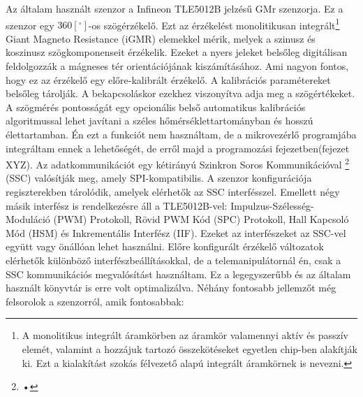 
Az általam használt szenzor a Infineon TLE5012B jelzésű GMr szenzorja. Ez a szenzor egy $360[^\circ]$-os szögérzékelő. Ezt az érzékelést monolitikusan integrált\footnote{A monolitikus integrált áramkörben az áramkör valamennyi aktív és passzív elemét, valamint a hozzájuk tartozó összekötéseket egyetlen chip-ben alakítják ki. Ezt a kialakítást szokás félvezető alapú integrált áramkörnek is nevezni.} Giant Magneto Resistance (iGMR) elemekkel mérik, melyek a szinusz és koszinusz szögkomponenseit érzékelik. Ezeket a nyers jeleket belsőleg digitálisan feldolgozzák a mágneses tér orientációjának kiszámításához. Ami nagyon fontos, hogy ez az érzékelő egy előre-kalibrált érzékelő. A kalibrációs paramétereket belsőleg tárolják. A bekapcsoláskor ezekhez viszonyítva adja meg a szögértékeket. A szögmérés pontosságát egy opcionális belső automatikus kalibrációs algoritmussal lehet javítani a széles hőmérséklettartományban és hosszú élettartamban. Én ezt a funkciót nem használtam, de a mikrovezérlő programjába integráltam ennek a lehetőségét, de erről majd a programozási fejezetben(fejezet XYZ). Az adatkommunikációt egy kétirányú Szinkron Soros Kommunikációval \footnote{•} (SSC) valósítják meg, amely SPI-kompatibilis. A szenzor konfigurációja regiszterekben tárolódik, amelyek elérhetők az SSC interfésszel. Emellett négy másik interfész is rendelkezésre áll a TLE5012B-vel: Impulzus-Szélesség-Moduláció (PWM) Protokoll, Rövid PWM Kód (SPC) Protokoll, Hall Kapcsoló Mód (HSM) és Inkrementális Interfész (IIF). Ezeket az interfészeket az SSC-vel együtt vagy önállóan lehet használni. Előre konfigurált érzékelő változatok elérhetők különböző interfészbeállításokkal, de a telemanipulátornál én, csak a SSC kommunikációs megvalósítást használtam. Ez a legegyszerűbb és az általam használt könyvtár is erre volt optimalizálva. Néhány fontosabb jellemzőt még felsorolok a szenzorról, amik fontosabbak:

